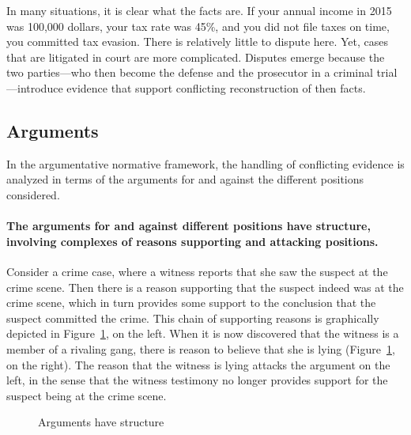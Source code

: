 \documentclass[10pt]{article}
\begin{document}
In many situations, it is clear what the facts are. If your annual income in 2015 was 100,000 dollars,  
your tax rate was 45\%, and you did not file taxes on time, you committed tax evasion. There is relatively little to dispute here. 
Yet, cases that are litigated in court are more complicated.
Disputes emerge because the two parties---who then become the defense and the 
prosecutor in a criminal trial---introduce evidence that support conflicting 
reconstruction of then facts. 



\subsection{Arguments}
\label{sec:confArg}


In the argumentative normative framework, the handling of conflicting evidence is analyzed in terms of the arguments for and against the different positions considered.

\paragraph{The arguments for and against different positions have structure, involving complexes of reasons supporting and attacking positions.} 

Consider a crime case, where a witness reports that she saw the suspect at the crime scene. Then there is a reason supporting that the suspect indeed was at the crime scene, which in turn provides some support to the conclusion that the suspect committed the crime. This chain of supporting reasons is graphically depicted in Figure~\ref{fig:arg2}, on the left. 
When it is now discovered that the witness is a member of a rivaling gang, there is reason to believe that she is lying (Figure~\ref{fig:arg2}, on the right). The reason that the witness is lying attacks the argument on the left, in the sense that the witness testimony no longer provides support for the suspect being at the crime scene.

\begin{figure}[bt]
\centering

\caption{Arguments have structure\label{fig:arg2}}
\end{figure}
\end{document}
